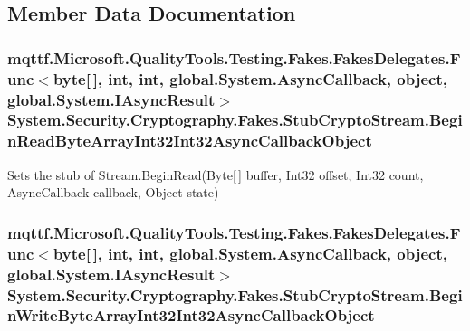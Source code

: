\subsection{Member Data Documentation}
\hypertarget{class_system_1_1_security_1_1_cryptography_1_1_fakes_1_1_stub_crypto_stream_ac0305cf89a1eb9c96e712d70ab101b89}{
\subsubsection[{Begin\-Read\-Byte\-Array\-Int32\-Int32\-Async\-Callback\-Object}]{\setlength{\rightskip}{0pt plus 5cm}mqttf.\-Microsoft.\-Quality\-Tools.\-Testing.\-Fakes.\-Fakes\-Delegates.\-Func$<$byte\mbox{[}$\,$\mbox{]}, int, int, global.\-System.\-Async\-Callback, object, global.\-System.\-I\-Async\-Result$>$ System.\-Security.\-Cryptography.\-Fakes.\-Stub\-Crypto\-Stream.\-Begin\-Read\-Byte\-Array\-Int32\-Int32\-Async\-Callback\-Object}}\label{class_system_1_1_security_1_1_cryptography_1_1_fakes_1_1_stub_crypto_stream_ac0305cf89a1eb9c96e712d70ab101b89}


Sets the stub of Stream.\-Begin\-Read(\-Byte\mbox{[}$\,$\mbox{]} buffer, Int32 offset, Int32 count, Async\-Callback callback, Object state)

\hypertarget{class_system_1_1_security_1_1_cryptography_1_1_fakes_1_1_stub_crypto_stream_aa97a496fae5bb30132891a9b385c5a25}{
\subsubsection[{Begin\-Write\-Byte\-Array\-Int32\-Int32\-Async\-Callback\-Object}]{\setlength{\rightskip}{0pt plus 5cm}mqttf.\-Microsoft.\-Quality\-Tools.\-Testing.\-Fakes.\-Fakes\-Delegates.\-Func$<$byte\mbox{[}$\,$\mbox{]}, int, int, global.\-System.\-Async\-Callback, object, global.\-System.\-I\-Async\-Result$>$ System.\-Security.\-Cryptography.\-Fakes.\-Stub\-Crypto\-Stream.\-Begin\-Write\-Byte\-Array\-Int32\-Int32\-Async\-Callback\-Object}}\label{class_system_1_1_security_1_1_cryptography_1_1_fakes_1_1_stub_crypto_stream_aa97a496fae5bb30132891a9b385c5a25}


